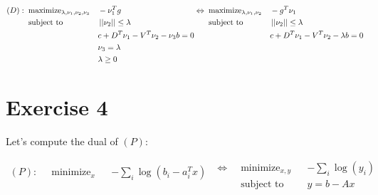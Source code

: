 \documentclass{article}
\begin{document}
\begin{equation*}
    \begin{aligned}
        (D):\;\; & \text{maximize}_{\lambda, \nu_1, \nu_2, \nu_3} &  & -\nu_1^Tg                          \\
                 & \text{subject to}                              &  & \left|\left| \nu_2 \right|\right| \le \lambda           \\
                 &                                                &  & c + D^T\nu_1 - V^T\nu_2 - \nu_3b=0 \\
                 &                                                &  & \nu_3 = \lambda                    \\
                 &                                                &  & \lambda \ge 0                      \\
    \end{aligned}
    \;
    \begin{aligned}
        \Leftrightarrow\;\; & \text{maximize}_{\lambda, \nu_1, \nu_2} &  & -g^T\nu_1                             \\
                            & \text{subject to}                       &  & \left|\left| \nu_2 \right|\right| \le \lambda              \\
                            &                                         &  & c + D^T\nu_1 - V^T\nu_2 - \lambda b=0 \\
                            &                                         &  &                                       \\
                            &                                         &  &                                       \\
    \end{aligned}
\end{equation*}

\section{Exercise 4}
Let's compute the dual of $(P)$:

\begin{equation*}
    \begin{aligned}
        (P):\;\; & \text{minimize}_x &  & -\sum_i \log(b_i - a_i^Tx) \\
                 &                   &  &                            \\
    \end{aligned}
    \;
    \begin{aligned}
        \Leftrightarrow\;\; & \text{minimize}_{x, y} &  & -\sum_i \log(y_i) \\
                            & \text{subject to}      &  & y = b - Ax        \\
    \end{aligned}
\end{equation*}
\end{document}
